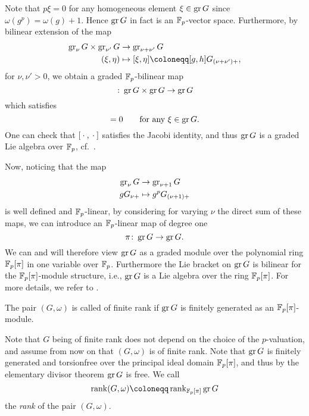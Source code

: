 Note that $p\xi = 0$ for any homogeneous element $\xi \in \operatorname{gr} G$ since $\omega(g^{p}) = \omega(g) + 1$. Hence $\operatorname{gr} G$ in fact is an $\mathbb{F}_p$-vector space. Furthermore, by bilinear extension of the map
\begin{align*}
  \gr_\nu G \times \gr_{\nu'} G &\to \gr_{\nu+\nu'} G \\
  (\xi,\eta) &\mapsto [\xi,\eta]\coloneqq [g,h]G_{(\nu+\nu')+},
\end{align*}
for $\nu,\nu'>0$, we obtain a graded $\mathbb{F}_p$-bilinear map
\begin{equation*}
  [\edot,\edot] \colon \gr G \times \gr G \to \gr G
\end{equation*}
which satisfies
\begin{equation*}
  [\xi,\xi]=0 \qquad \text{for any }\xi\in\gr G.
\end{equation*}
One can check that $[\:\cdot\:,\:\cdot\:]$ satisfies the Jacobi identity, and thus $\operatorname{gr} G$ is a graded Lie algebra over $\mathbb{F}_p$, cf.\ \cite[Sect.~23]{Sch}.

Now, noticing that the map
\begin{align*}
  \operatorname{gr}_{\nu} G &\to \operatorname{gr}_{\nu+1} G \\
  gG_{\nu+} &\mapsto g^pG_{(\nu+1)+}
\end{align*}
is well defined and $\mathbb{F}_p$-linear, by considering for varying $\nu$ the direct sum of these maps, we can introduce an $\mathbb{F}_p$-linear map of degree one
\begin{equation*}
  \pi \colon \operatorname{gr} G \to \operatorname{gr} G.
\end{equation*}%
%
We can and will therefore view $\operatorname{gr} G$ as a graded module over the polynomial ring $\mathbb{F}_p[\pi]$ in one variable over $\mathbb{F}_p$. Furthermore the Lie bracket on $\operatorname{gr} G$ is bilinear for the $\mathbb{F}_p[\pi]$-module structure, i.e., $\operatorname{gr} G$ is a Lie algebra over the ring $\mathbb{F}_p[\pi]$. For more details, we refer to \cite[Sect.~25]{Sch}.
\begin{definition}
  The pair $(G,\omega)$ is called of finite rank if $\operatorname{gr} G$ is finitely generated as an $\mathbb{F}_p[\pi]$-module.
\end{definition}
Note that $G$ being of finite rank does not depend on the choice of the $p$-valuation, and assume from now on that $(G,\omega)$ is of finite rank. Note that $\operatorname{gr} G$ is finitely generated and torsionfree over the principal ideal domain $\mathbb{F}_{p}[\pi]$, and thus by the elementary divisor theorem  $\operatorname{gr} G$ is free. We call
\begin{equation*}
  \rank(G,\omega) \coloneqq \rank_{\F_p[\pi]} \gr G
\end{equation*}%
%
the \emph{rank} of the pair $(G,\omega)$.

